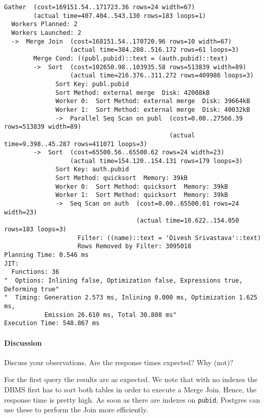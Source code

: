 \documentclass[11pt]{scrartcl}
\begin{document}
  {\small
\parskip0pt\begin{verbatim}
Gather  (cost=169151.54..171723.36 rows=24 width=67)
        (actual time=407.404..543.130 rows=183 loops=1)
  Workers Planned: 2
  Workers Launched: 2
  ->  Merge Join  (cost=168151.54..170720.96 rows=10 width=67)
                  (actual time=384.208..516.172 rows=61 loops=3)
        Merge Cond: ((publ.pubid)::text = (auth.pubid)::text)
        ->  Sort  (cost=102650.98..103935.58 rows=513839 width=89)
                  (actual time=216.376..311.272 rows=409986 loops=3)
              Sort Key: publ.pubid
              Sort Method: external merge  Disk: 42008kB
              Worker 0:  Sort Method: external merge  Disk: 39664kB
              Worker 1:  Sort Method: external merge  Disk: 40032kB
              ->  Parallel Seq Scan on publ  (cost=0.00..27566.39 rows=513839 width=89)
                                             (actual time=9.398..45.287 rows=411071 loops=3)
        ->  Sort  (cost=65500.56..65500.62 rows=24 width=23)
                  (actual time=154.120..154.131 rows=179 loops=3)
              Sort Key: auth.pubid
              Sort Method: quicksort  Memory: 39kB
              Worker 0:  Sort Method: quicksort  Memory: 39kB
              Worker 1:  Sort Method: quicksort  Memory: 39kB
              ->  Seq Scan on auth  (cost=0.00..65500.01 rows=24 width=23)
                                    (actual time=10.622..154.050 rows=183 loops=3)
                    Filter: ((name)::text = 'Divesh Srivastava'::text)
                    Rows Removed by Filter: 3095018
Planning Time: 0.546 ms
JIT:
  Functions: 36
"  Options: Inlining false, Optimization false, Expressions true, Deforming true"
"  Timing: Generation 2.573 ms, Inlining 0.000 ms, Optimization 1.625 ms,
           Emission 26.610 ms, Total 30.808 ms"
Execution Time: 548.867 ms
\end{verbatim}}

\paragraph{Discussion}

Discuss your observations.
Are the response times expected?
Why (not)?

For the first query the results are as expected.
We note that with no indexes the DBMS first has to sort both tables in order to execute a Merge Join.
Hence, the response time is pretty high.
As soon as there are indexes on \texttt{pubid}, Postgres can use these to perform the Join more efficiently.
\end{document}
